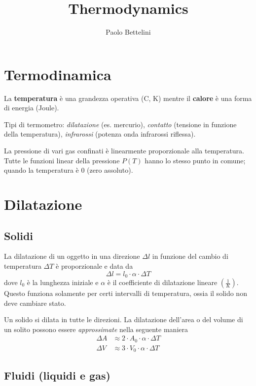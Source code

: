 \documentclass{article}
\title{Thermodynamics}
\author{Paolo Bettelini}
\date{}
\newcommand{\cel}{C\degree}
\begin{document}
\maketitle
\tableofcontents
\pagebreak


\section{Termodinamica}

La \textbf{temperatura} è una grandezza operativa (\cel, K)
mentre il \textbf{calore} è una forma di energia (Joule).

Tipi di termometro: \textit{dilatazione} (es. mercurio),
\textit{contatto} (tensione in funzione della temperatura),
\textit{infrarossi} (potenza onda infrarossi riflessa).

La pressione di vari gas confinati è linearmente proporzionale alla temperatura.
Tutte le funzioni linear della pressione \(P(T)\) hanno lo stesso punto in comune;
quando la temperatura è \(0\) (zero assoluto).

\section{Dilatazione}

\subsection{Solidi}

La dilatazione di un oggetto in una direzione \(\Delta l\) in funzione del
cambio di temperatura \(\Delta T\) è proporzionale e data da
\[
    \Delta l = l_0 \cdot \alpha \cdot \Delta T
\]
dove \(l_0\) è la lunghezza iniziale e \(\alpha\) è il coefficiente di dilatazione lineare
\((\frac{1}{K})\). Questo funziona solamente per certi intervalli di temperatura,
ossia il solido non deve cambiare stato.

Un solido si dilata in tutte le direzioni.
La dilatazione dell'area o del volume di un solito possono essere \textit{approssimate}
nella seguente maniera
\begin{align*}
    \Delta A &\approx 2 \cdot A_0 \cdot \alpha \cdot \Delta T \\
    \Delta V &\approx 3 \cdot V_0 \cdot \alpha \cdot \Delta T
\end{align*}

\subsection{Fluidi (liquidi e gas)}
\end{document}
